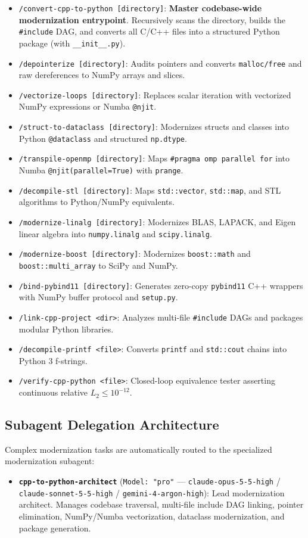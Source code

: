 \documentclass[11pt,a4paper]{article}
\theoremstyle{definition}
\begin{document}
\begin{itemize}
    \item \texttt{/convert-cpp-to-python [directory]}: \textbf{Master codebase-wide modernization entrypoint}. Recursively scans the directory, builds the \texttt{\#include} DAG, and converts all C/C++ files into a structured Python package (with \texttt{\_\_init\_\_.py}).
    \item \texttt{/depointerize [directory]}: Audits pointers and converts \texttt{malloc/free} and raw dereferences to NumPy arrays and slices.
    \item \texttt{/vectorize-loops [directory]}: Replaces scalar iteration with vectorized NumPy expressions or Numba \texttt{@njit}.
    \item \texttt{/struct-to-dataclass [directory]}: Modernizes structs and classes into Python \texttt{@dataclass} and structured \texttt{np.dtype}.
    \item \texttt{/transpile-openmp [directory]}: Maps \texttt{\#pragma omp parallel for} into Numba \texttt{@njit(parallel=True)} with \texttt{prange}.
    \item \texttt{/decompile-stl [directory]}: Maps \texttt{std::vector}, \texttt{std::map}, and STL algorithms to Python/NumPy equivalents.
    \item \texttt{/modernize-linalg [directory]}: Modernizes BLAS, LAPACK, and Eigen linear algebra into \texttt{numpy.linalg} and \texttt{scipy.linalg}.
    \item \texttt{/modernize-boost [directory]}: Modernizes \texttt{boost::math} and \texttt{boost::multi\_array} to SciPy and NumPy.
    \item \texttt{/bind-pybind11 [directory]}: Generates zero-copy \texttt{pybind11} C++ wrappers with NumPy buffer protocol and \texttt{setup.py}.
    \item \texttt{/link-cpp-project <dir>}: Analyzes multi-file \texttt{\#include} DAGs and packages modular Python libraries.
    \item \texttt{/decompile-printf <file>}: Converts \texttt{printf} and \texttt{std::cout} chains into Python 3 f-strings.
    \item \texttt{/verify-cpp-python <file>}: Closed-loop equivalence tester asserting continuous relative $L_2 \le 10^{-12}$.
\end{itemize}

\subsection{Subagent Delegation Architecture}
Complex modernization tasks are automatically routed to the specialized modernization subagent:
\begin{itemize}
    \item \textbf{\texttt{cpp-to-python-architect}} (\texttt{Model: "pro"} --- \texttt{claude-opus-5-5-high} / \texttt{claude-sonnet-5-5-high} / \texttt{gemini-4-argon-high}): Lead modernization architect. Manages codebase traversal, multi-file include DAG linking, pointer elimination, NumPy/Numba vectorization, dataclass modernization, and package generation.
\end{itemize}
\end{document}
